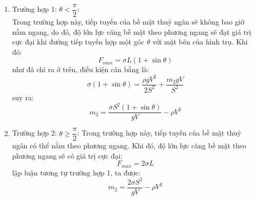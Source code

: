\begin{enumerate}
  \item Trường hợp 1: $\theta<\dfrac{\pi}{2}$:\\
        Trong trường hợp này, tiếp tuyến của bề mặt thuỷ ngân sẽ không bao giờ nằm ngang, do đó, độ lớn lực căng bề mặt theo phương ngang sẽ đạt giá trị cực đại khi đường tiếp tuyến hợp một góc $\theta$ với mặt bên của hình trụ. Khi đó:
        \begin{equation*}
          F_{max}=\sigma L(1+\sin\theta)
        \end{equation*}
        như đã chỉ ra ở trên, điều kiện cân bằng là:
        \begin{equation*}
          \sigma(1+\sin\theta)=\frac{\rho gV^{2}}{2S^{2}}+\frac{m_{2}gV}{S^{2}}
        \end{equation*}
        suy ra:
        \begin{equation*}
          m_{2}=\frac{\sigma S^{2}(1+\sin\theta)}{gV}-\rho V^{2}
        \end{equation*}
  \item Trường hợp 2: $\theta\geqslant\dfrac{\pi}{2}$:
        Trong trường hợp này, tiếp tuyến của bề mặt thuỷ ngân có thể nằm theo phương ngang. Khi đó, độ lớn lực căng bề mặt theo phương ngang sẽ có giá trị cực đại:
        \begin{equation*}
          F_{max}=2\sigma L
        \end{equation*}
        lập luận tương tự trường hợp 1, ta được:
        \begin{equation*}
          m_{2}=\frac{2\sigma S^{2}}{gV}-\rho V^{2}
        \end{equation*}
\end{enumerate}


